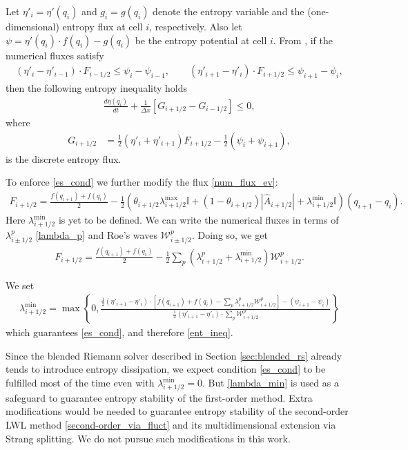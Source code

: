 \documentclass[preprint, 11pt]{article}
\newcommand{\W}{{\mathcal W}}
\newcommand{\bff}{{f}}
\newcommand{\bfF}{{F}}
\newcommand{\entvar}{\eta'}
\newcommand{\bfq}{{q}}
\newcommand{\efp}{\psi}
\newcommand{\entflux}{g}
\begin{document}
Let $\entvar_i=\entvar(\bfq_i)$ and $\entflux_i=\entflux(\bfq_i)$ denote the entropy variable and the
(one-dimensional) entropy flux at cell $i$, respectively.
Also let $\efp=\entvar(\bfq_i)\cdot \bff(\bfq_i)-\entflux(\bfq_i)$ be the entropy potential at cell $i$.
From \cite[\S 4]{tadmor1987numerical}, if the numerical fluxes satisfy
\begin{align}\label{es_cond}
(\entvar_{i}-\entvar_{i-1})\cdot \bfF_{i-1/2}\leq \efp_{i}-\efp_{i-1},
  \qquad
  (\entvar_{i+1}-\entvar_i)\cdot \bfF_{i+1/2}\leq \efp_{i+1}-\efp_i,
\end{align}
then the following entropy inequality holds
\begin{align}\label{ent_ineq}
  \frac{d\eta(\bfq_i)}{dt}+\frac{1}{\Delta x}\left[G_{i+1/2}-G_{i-1/2}\right]\leq 0,
\end{align}
where
\begin{align*}
    G_{i+1/2} &= \frac{1}{2}\left(\entvar_i+\entvar_{i+1}\right)\bfF_{i+1/2}-\frac{1}{2}(\efp_{i}+\efp_{i+1}),
\end{align*}
is the discrete entropy flux.

To enforce \eqref{es_cond} we further modify the flux \eqref{num_flux_ev}:
\begin{align*}
  \bfF_{i+1/2} = \frac{\bff(\bfq_{i+1})+\bff(\bfq_i)}{2}
  - \frac{1}{2} \left( \theta_{i+1/2}\lambda_{i+1/2}^{\max}\mathbb{I} + (1-\theta_{i+1/2})|\hat A_{i+1/2}| +\lambda_{i+1/2}^{\min}\mathbb{I}\right)(\bfq_{i+1}-\bfq_{i}).
\end{align*}
Here $\lambda_{i+1/2}^{\min}$ is yet to be defined.
We can write the numerical fluxes in terms of $\lambda^p_{i\pm 1/2}$ \eqref{lambda_p}
and Roe's waves $\W_{i\pm 1/2}^p$.
Doing so, we get
\begin{align*}
  \bfF_{i+1/2} = \frac{\bff(\bfq_{i+1})+\bff(\bfq_i)}{2}
  - \frac{1}{2}\sum_p(\lambda_{i+1/2}^p+\lambda_{i+1/2}^{\min})\W_{i+1/2}^p.
\end{align*}

We set
\begin{align}\label{lambda_min}
  \lambda_{i+1/2}^{\min} = \max\left\{0,\frac{\frac{1}{2}(\entvar_{i+1}-\entvar_{i})\cdot\left[\bff(\bfq_{i+1})+\bff(\bfq_{i})-\sum_p\lambda_{i+1/2}^p\W_{i+1/2}^p\right]-(\efp_{i+1}-\efp_i)}{\frac{1}{2}(\entvar_{i+1}-\entvar_{i})\cdot\sum_p\W_{i+1/2}^p}\right\}
\end{align}
which guarantees \eqref{es_cond}, and therefore \eqref{ent_ineq}.

Since the blended Riemann solver described in Section \ref{sec:blended_rs} already
tends to introduce entropy dissipation,
we expect condition \eqref{es_cond} to be fulfilled most of the time even with $\lambda_{i+1/2}^{\min}=0$.
But \eqref{lambda_min} is used as a safeguard to guarantee entropy stability of the first-order method.
Extra modifications would be needed to guarantee entropy stability of the second-order LWL method
\eqref{second-order_via_fluct} and its multidimensional extension via Strang splitting.
We do not pursue such modifications in this work.
\end{document}
